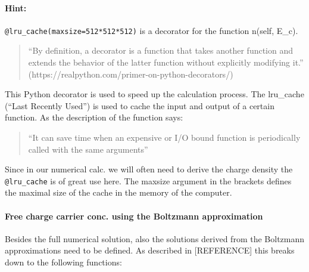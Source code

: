 \documentclass[11pt]{article}
\begin{document}
    \hypertarget{hint}{%
\paragraph{Hint:}\label{hint}}

\texttt{@lru\_cache(maxsize=512*512*512)} is a decorator for the
function n(self, E\_c).

\begin{quote}
``By definition, a decorator is a function that takes another function
and extends the behavior of the latter function without explicitly
modifying it.'' (https://realpython.com/primer-on-python-decorators/)
\end{quote}

This Python decorator is used to speed up the calculation process. The
lru\_cache (``Last Recently Used'') is used to cache the input and
output of a certain function. As the description of the function says:

\begin{quote}
``It can save time when an expensive or I/O bound function is
periodically called with the same arguments''
\end{quote}

Since in our numerical calc. we will often need to derive the charge
density the \texttt{@lru\_cache} is of great use here. The maxsize
argument in the brackets defines the maximal size of the cache in the
memory of the computer.

    \hypertarget{free-charge-carrier-conc.-using-the-boltzmann-approximation}{%
\paragraph{Free charge carrier conc. using the Boltzmann
approximation}\label{free-charge-carrier-conc.-using-the-boltzmann-approximation}}

Besides the full numerical solution, also the solutions derived from the
Boltzmann approximations need to be defined. As described in
{[}REFERENCE{]} this breaks down to the following functions:
\end{document}
